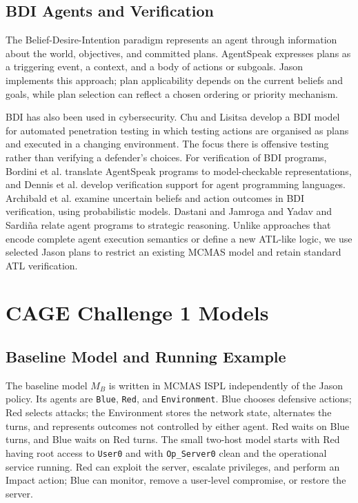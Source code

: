 \documentclass[runningheads]{llncs}
\begin{document}
\subsection{BDI Agents and Verification}

The Belief-Desire-Intention paradigm \cite{rao1995bdi} represents an agent through information about the world, objectives, and committed plans. AgentSpeak \cite{rao1996agentspeak} expresses plans as a triggering event, a context, and a body of actions or subgoals. Jason \cite{bordini2007jason} implements this approach; plan applicability depends on the current beliefs and goals, while plan selection can reflect a chosen ordering or priority mechanism.

BDI has also been used in cybersecurity. Chu and Lisitsa \cite{chu2019bdi} develop a BDI model for automated penetration testing in which testing actions are organised as plans and executed in a changing environment. The focus there is offensive testing rather than verifying a defender's choices. For verification of BDI programs, Bordini et al. \cite{bordini2003modelchecking,bordini2006verifying} translate AgentSpeak programs to model-checkable representations, and Dennis et al. \cite{dennis2012modelchecking} develop verification support for agent programming languages. Archibald et al. \cite{archibald2025uncertainty} examine uncertain beliefs and action outcomes in BDI verification, using probabilistic models. Dastani and Jamroga \cite{dastani2010strategies} and Yadav and Sardi\~na \cite{yadav2012reasoning} relate agent programs to strategic reasoning. Unlike approaches that encode complete agent execution semantics or define a new ATL-like logic, we use selected Jason plans to restrict an existing MCMAS model and retain standard ATL verification.



\section{CAGE Challenge 1 Models}

\subsection{Baseline Model and Running Example}

The baseline model $M_B$ is written in MCMAS ISPL independently of the Jason policy. Its agents are \texttt{Blue}, \texttt{Red}, and \texttt{Environment}. Blue chooses defensive actions; Red selects attacks; the Environment stores the network state, alternates the turns, and represents outcomes not controlled by either agent. Red waits on Blue turns, and Blue waits on Red turns. The small two-host model starts with Red having root access to \texttt{User0} and with \texttt{Op\_Server0} clean and the operational service running. Red can exploit the server, escalate privileges, and perform an Impact action; Blue can monitor, remove a user-level compromise, or restore the server.
\end{document}
